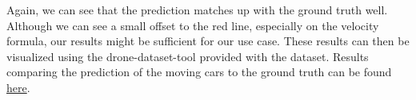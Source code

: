Again, we can see that the prediction matches up with the ground truth well.
Although we can see a small offset to the red line, especially on the velocity formula, our results might be sufficient for our use case.
These results can then be visualized using the drone-dataset-tool provided with the dataset.
Results comparing the prediction of the moving cars to the ground truth can be found \href{https://github.com/avocadoali/social_ai_practical_course}{here}.

